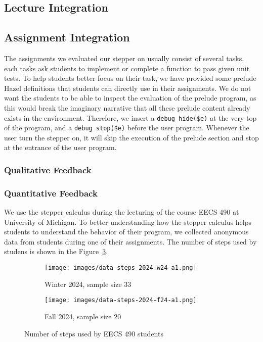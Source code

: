 
\subsection{Lecture Integration}

\subsection{Assignment Integration}

The assignments we evaluated our stepper on usually consist of several
tasks, each tasks ask students to implement or complete a function to
pass given unit tests. To help students better focus on their task, we
have provided some prelude Hazel definitions that students can
directly use in their assignments. We do not want the students to be
able to inspect the evaluation of the prelude program, as this would
break the imaginary narrative that all these prelude content already
exists in the environment. Therefore, we insert a
\lstinline[language=hazel]{debug hide($e)} at the very top of the
program, and a \lstinline[language=hazel]{debug stop($e)} before the
user program. Whenever the user turn the stepper on, it will skip the
execution of the prelude section and stop at the entrance of the user
program.

\subsubsection{Qualitative Feedback}

\subsubsection{Quantitative Feedback}

We use the stepper calculus during the lecturing of the course EECS
490 at University of Michigan. To better understanding how the stepper
calculus helps students to understand the behavior of their program,
we collected anonymous data from students during one of their
assignments. The number of steps used by studens is shown in the
Figure~\ref{fig:eval-num-steps}.

\begin{figure}[h]
  \centering
  \begin{minipage}{.40\linewidth}
    \begin{subfigure}{\linewidth}
      \texttt{[image: images/data-steps-2024-w24-a1.png]}
      \caption{Winter 2024, sample size 33}
      \label{fig:eval-num-steps-w24}
    \end{subfigure}
  \end{minipage}
  \quad
  \begin{minipage}{.40\linewidth}
    \begin{subfigure}{\linewidth}
      \texttt{[image: images/data-steps-2024-f24-a1.png]}
      \caption{Fall 2024, sample size 20}
      \label{fig:eval-num-steps-f24}
    \end{subfigure}
  \end{minipage}
  \caption{Number of steps used by EECS 490 students}
  \label{fig:eval-num-steps}
\end{figure}

